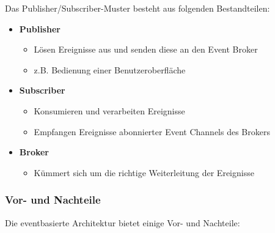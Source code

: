         Das Publisher/Subscriber-Muster besteht aus folgenden Bestandteilen:
        \begin{itemize}
            \item \textbf{Publisher}
            \begin{itemize}[label=$\circ$]
                \item Lösen Ereignisse aus und senden diese an den Event Broker
                \item z.B. Bedienung einer Benutzeroberfläche 
            \end{itemize}
            
            \item \textbf{Subscriber}
            \begin{itemize}[label=$\circ$]
                \item Konsumieren und verarbeiten Ereignisse
                \item Empfangen Ereignisse abonnierter Event Channels des Brokers
            \end{itemize}
            
            \item \textbf{Broker}
            \begin{itemize}[label=$\circ$]
                \item Kümmert sich um die richtige Weiterleitung der Ereignisse
            \end{itemize}
        \end{itemize}

        \cite{EA:Web63}
        
        \clearpage
        
    
        \subsubsection{Vor- und Nachteile}

        Die eventbasierte Architektur bietet einige Vor- und Nachteile:
    
